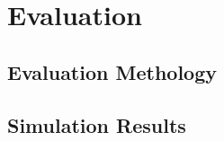 \section{Evaluation}
\label{sec:evaluation}

\subsection{Evaluation Methology}



\subsection{Simulation Results}

